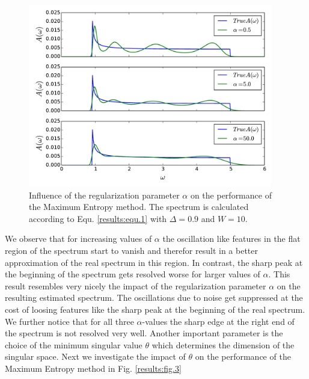 \begin{figure}[htbp]
	\centering
	\includegraphics[width=0.95\textwidth]{./images/BCS_varying_alpha.pdf}
	\caption{Influence of the regularization parameter $\alpha$ on the performance of the Maximum Entropy method. The spectrum is calculated according to Equ. \ref{results:equ.1} with $\Delta = 0.9$ and $W = 10$.}
	\label{results:fig.2}
\end{figure}
\FloatBarrier
We observe that for increasing values of $\alpha$ the oscillation like features in the flat region of the spectrum start to vanish and therefor result in a better approximation of the real spectrum in this region. In contrast, the sharp peak at the beginning of the spectrum gets resolved worse for larger values of $\alpha$. This result resembles very nicely the impact of the regularization parameter $\alpha$ on the resulting estimated spectrum. The oscillations due to noise get suppressed at the cost of loosing features like the sharp peak at the beginning of the real spectrum. We further notice that for all three $\alpha$-values the sharp edge at the right end of the spectrum is not resolved very well.\newline
Another important parameter is the choice of the minimum singular value $\theta$ which determines the dimension of the singular space.
Next we investigate the impact of $\theta$ on the performance of the Maximum Entropy method in Fig. \ref{results:fig.3}

